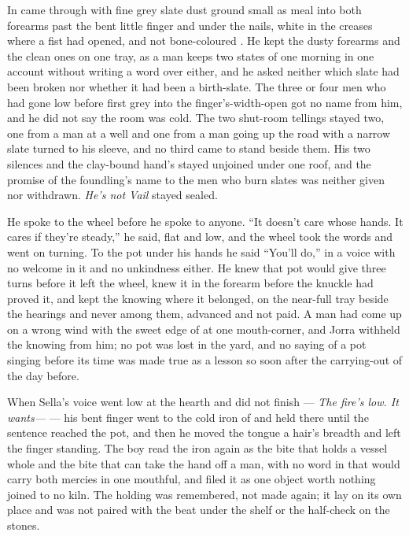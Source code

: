 In   came through with fine grey slate dust ground small as meal into both forearms past the bent little finger and under the nails, white in the creases where a fist had opened, and not bone-coloured . He kept the dusty forearms and the clean ones on one tray, as a man keeps two states of one morning in one account without writing a word over either, and he asked neither which slate had been broken nor whether it had been a birth-slate. The three or four men who had gone low before first grey into the finger's-width-open  got no name from him, and he did not say the room was cold. The two shut-room tellings stayed two, one from a man at a well and one from a man going up the road with a narrow slate turned to his sleeve, and no third came to stand beside them. His two silences and the clay-bound hand's stayed unjoined under one roof, and the promise of the foundling's name to the men who burn slates was neither given nor withdrawn. \emph{He's not Vail} stayed sealed.

He spoke to the wheel before he spoke to anyone. “It doesn't care whose hands. It cares if they're steady,” he said, flat and low, and the wheel took the words and went on turning. To the pot under his hands he said “You'll do,” in a voice with no welcome in it and no unkindness either. He knew  that pot would give three turns before it left the wheel, knew it in the forearm before the knuckle had proved it, and kept the knowing where it belonged, on the near-full tray beside the hearings and never among them, advanced and not paid. A man had come up on a wrong wind with the sweet edge of  at one mouth-corner, and Jorra withheld the knowing from him; no pot was lost in the yard, and no saying of a pot singing before its time was made true as a lesson so soon after the carrying-out of the day before.

When Sella's voice went low at the hearth and did not finish --- \emph{The fire's low. It wants---} --- his bent finger went to the cold iron of  and held there until the sentence reached the pot, and then he moved the tongue a hair's breadth and left the finger standing. The boy read the iron again as the bite that holds a vessel whole and the bite that can take the hand off a man, with no word in  that would carry both mercies in one mouthful, and filed it as one object worth nothing joined to no kiln. The holding was remembered, not made again; it lay on its own place and was not paired with the beat under the shelf or the half-check on the stones.

